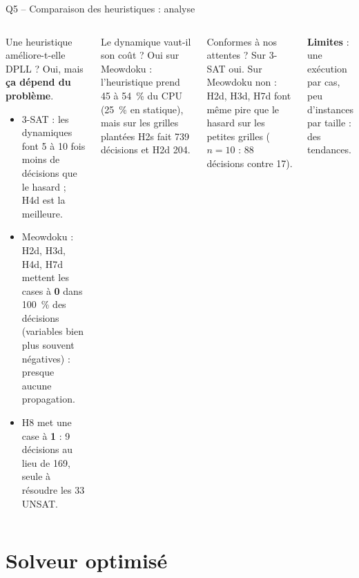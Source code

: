 \documentclass[aspectratio=169,11pt]{beamer}
\begin{document}
\begin{frame}{Q5 -- Comparaison des heuristiques : analyse}
  \begin{columns}[T]
    \begin{block}{Une heuristique améliore-t-elle DPLL ?}
      \small Oui, mais \textbf{ça dépend du problème}.
      \begin{itemize}
        \item 3-SAT : les dynamiques font 5 à 10 fois moins de décisions que le hasard ; H4d est la meilleure.
        \item Meowdoku : H2d, H3d, H4d, H7d mettent les cases à \textbf{0} dans 100~\% des décisions (variables bien plus souvent négatives) : presque aucune propagation.
        \item H8 met une case à \textbf{1} : 9 décisions au lieu de 169, seule à résoudre les 33 UNSAT.
      \end{itemize}
    \end{block}
    \begin{block}{Le dynamique vaut-il son coût ?}
      \small Oui sur Meowdoku : l'heuristique prend 45 à 54~\% du CPU (25~\% en statique), mais sur les grilles plantées H2s fait 739 décisions et H2d 204.
    \end{block}
    \begin{block}{Conformes à nos attentes ?}
      \small Sur 3-SAT oui. Sur Meowdoku non : H2d, H3d, H7d font même pire que le hasard sur les petites grilles ($n=10$ : 88 décisions contre 17).
    \end{block}
    {\footnotesize \textbf{Limites} : une exécution par cas, peu d'instances par taille : des tendances.\par}
  \end{columns}
\end{frame}

\section{Solveur optimisé}
\end{document}
